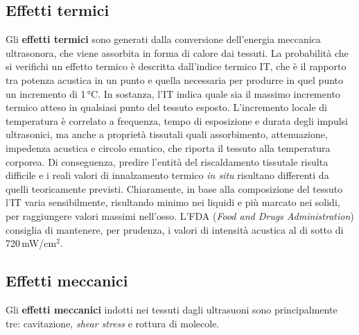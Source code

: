 \documentclass{report}
\numberwithin{equation}{section}
\numberwithin{figure}{section}
\begin{document}
\subsection{Effetti termici}
Gli \textbf{effetti termici} sono generati dalla conversione dell'energia meccanica ultrasonora, che viene assorbita in forma di calore dai tessuti. La probabilità che si verifichi un effetto termico è descritta dall'indice termico IT, che è il rapporto tra potenza acustica in un punto e quella necessaria per produrre in quel punto un incremento di 1\,°C. In sostanza, l’IT indica quale sia il massimo incremento termico atteso in qualsiasi punto del tessuto esposto. L'incremento locale di temperatura è correlato a frequenza, tempo di esposizione e durata degli impulsi ultrasonici, ma anche a proprietà tissutali quali assorbimento, attenuazione, impedenza acustica e circolo ematico, che riporta il tessuto alla temperatura corporea. Di conseguenza, predire l’entità del riscaldamento tissutale risulta difficile e i reali valori di innalzamento termico \textit{in situ} risultano differenti da quelli teoricamente previsti. Chiaramente, in base alla composizione del tessuto l’IT varia sensibilmente, risultando minimo nei liquidi e più marcato nei solidi, per raggiungere valori massimi nell'osso. L’FDA (\textit{Food and Drugs Administration}) consiglia di mantenere, per prudenza, i valori di intensità acustica al di sotto di
720\,mW/$\text{cm}^2$.

\subsection{Effetti meccanici}
Gli \textbf{effetti meccanici} indotti nei tessuti dagli ultrasuoni sono principalmente tre: cavitazione, \textit{shear stress} e rottura di molecole.
\end{document}
